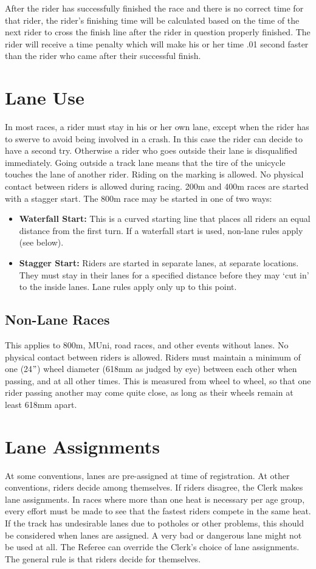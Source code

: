 After the rider has successfully finished the race and there is no correct time for that rider, the rider's finishing time will be calculated based on the time of the next rider to cross the finish line after the rider in question properly finished.
The rider will receive a time penalty which will make his or her time .01 second faster than the rider who came after their successful finish.

\section{Lane Use}
In most races, a rider must stay in his or her own lane, except when the rider has to swerve to avoid being involved in a crash.
In this case the rider can decide to have a second try.
Otherwise a rider who goes outside their lane is disqualified immediately.
Going outside a track lane means that the tire of the unicycle touches the lane of another rider.
Riding on the marking is allowed.
No physical contact between riders is allowed during racing.
200m and 400m races are started with a stagger start.
The 800m race may be started in one of two ways:
\begin{itemize}
\item \textbf{Waterfall Start:} This is a curved starting line that places all riders an equal distance from the first turn.
If a waterfall start is used, non-lane rules apply (see below).
\item \textbf{Stagger Start:} Riders are started in separate lanes, at separate locations.
They must stay in their lanes for a specified distance before they may ‘cut in' to the inside lanes.
Lane rules apply only up to this point.
\end{itemize}

\subsection{Non-Lane Races \label{subsec:racing_lane-use_non-lane-races}}
This applies to 800m, MUni, road races, and other events without lanes.
No physical contact between riders is allowed.
Riders must maintain a minimum of one (24$"$) wheel diameter (618mm as judged by eye) between each other when passing, and at all other times.
This is measured from wheel to wheel, so that one rider passing another may come quite close, as long as their wheels remain at least 618mm apart.

\section{Lane Assignments}
At some conventions, lanes are pre-assigned at time of registration.
At other conventions, riders decide among themselves.
If riders disagree, the Clerk makes lane assignments.
In races where more than one heat is necessary per age group, every effort must be made to see that the fastest riders compete in the same heat.
If the track has undesirable lanes due to potholes or other problems, this should be considered when lanes are assigned.
A very bad or dangerous lane might not be used at all.
The Referee can override the Clerk's choice of lane assignments.
The general rule is that riders decide for themselves.

